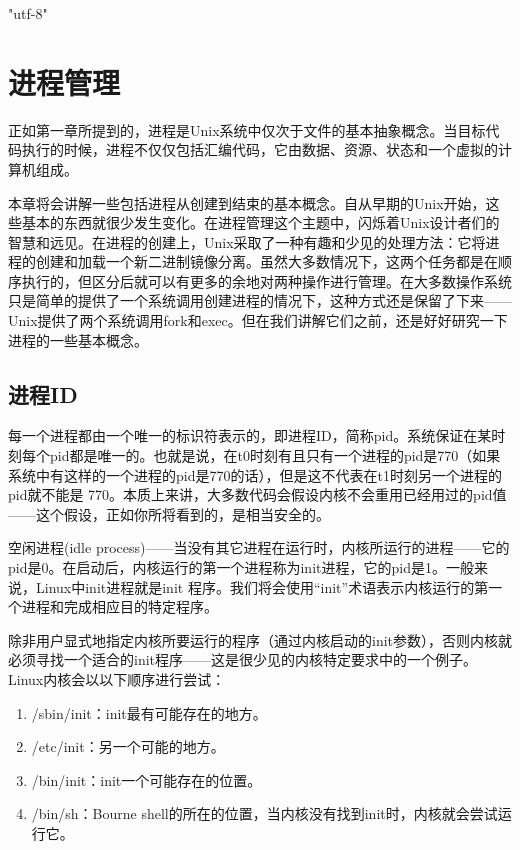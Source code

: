 \ifx\atempxetex\usewhat
\XeTeXinputencoding "utf-8"
\fi
{}

\chapter{进程管理}

正如第一章所提到的，进程是Unix系统中仅次于文件的基本抽象概念。当目标代码执行的时候，进程不仅仅包括汇编代码，它由数据、资源、状态和一个虚拟的计算机组成。

本章将会讲解一些包括进程从创建到结束的基本概念。自从早期的Unix开始，这些基本的东西就很少发生变化。在进程管理这个主题中，闪烁着Unix设计者们的智慧和远见。在进程的创建上，Unix采取了一种有趣和少见的处理方法：它将进程的创建和加载一个新二进制镜像分离。虽然大多数情况下，这两个任务都是在顺序执行的，但区分后就可以有更多的余地对两种操作进行管理。在大多数操作系统只是简单的提供了一个系统调用创建进程的情况下，这种方式还是保留了下来——Unix提供了两个系统调用fork和exec。但在我们讲解它们之前，还是好好研究一下进程的一些基本概念。

\section{进程ID}

每一个进程都由一个唯一的标识符表示的，即进程ID，简称pid。系统保证在某时刻每个pid都是唯一的。也就是说，在t0时刻有且只有一个进程的pid是770（如果系统中有这样的一个进程的pid是770的话），但是这不代表在t1时刻另一个进程的pid就不能是 770。本质上来讲，大多数代码会假设内核不会重用已经用过的pid值——这个假设，正如你所将看到的，是相当安全的。

空闲进程(idle process)——当没有其它进程在运行时，内核所运行的进程——它的pid是0。在启动后，内核运行的第一个进程称为init进程，它的pid是1。一般来说，Linux中init进程就是init 程序。我们将会使用“init”术语表示内核运行的第一个进程和完成相应目的特定程序。

除非用户显式地指定内核所要运行的程序（通过内核启动的init参数），否则内核就必须寻找一个适合的init程序——这是很少见的内核特定要求中的一个例子。Linux内核会以以下顺序进行尝试：

\begin{enumerate}
\item /sbin/init：init最有可能存在的地方。
\item /etc/init：另一个可能的地方。
\item /bin/init：init一个可能存在的位置。
\item /bin/sh：Bourne shell的所在的位置，当内核没有找到init时，内核就会尝试运行它。
\end{enumerate}

